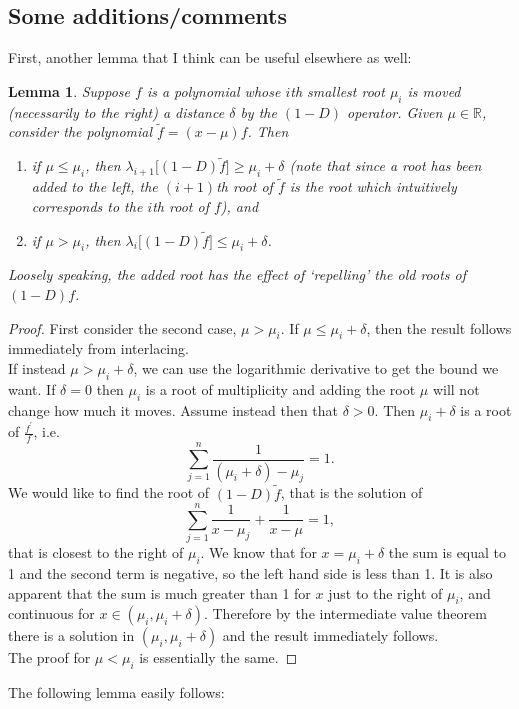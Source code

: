 \documentclass[11pt]{article}
\newtheorem{lemma}[theorem]{Lemma}
\newcommand{\R}{\mathbb{R}}
\begin{document}
\subsection{Some additions/comments}
First, another lemma that I think can be useful elsewhere as well:
\begin{lemma}
	Suppose $f$ is a polynomial whose $i$th smallest root $\mu_i$ is moved (necessarily to the right) a distance $\delta$ by the $(1-D)$ operator. Given $\mu \in \R$, consider the polynomial $\tilde{f} = (x-\mu)f$. Then
	\begin{enumerate}
		\item if $\mu \leq \mu_i$, then $\lambda_{i+1}\big[(1-D)\tilde{f}\big] \geq \mu_i + \delta$ (note that since a root has been added to the left, the $(i+1)$th root of $\tilde{f}$ is the root which intuitively corresponds to the $i$th root of $f$), and
		\item if $\mu > \mu_i$, then $\lambda_{i}\big[(1-D)\tilde{f}\big] \leq \mu_i + \delta$.
	\end{enumerate}
	Loosely speaking, the added root has the effect of `repelling' the old roots of $(1-D)f$.
\end{lemma}
\begin{proof}
	First consider the second case, $\mu > \mu_i$. If $\mu \leq \mu_i + \delta$, then the result follows immediately from interlacing. \\
	If instead $\mu > \mu_i + \delta$, we can use the logarithmic derivative to get the bound we want. If $\delta=0$ then $\mu_i$ is a root of multiplicity and adding the root $\mu$ will not change how much it moves. Assume instead then that $\delta>0$. Then $\mu_i+\delta$ is a root of $\frac{f^\prime}{f}$, i.e.
		\[ \sum_{j=1}^n \frac{1}{(\mu_i+\delta)-\mu_j} = 1. \]
	We would like to find the root of $(1-D)\tilde{f}$, that is the solution of
		\[ \sum_{j=1}^n \frac{1}{x-\mu_j} + \frac{1}{x-\mu} = 1, \]
	that is closest to the right of $\mu_i$. We know that for $x=\mu_i+\delta$ the sum is equal to 1 and the second term is negative, so the left hand side is less than 1. It is also apparent that the sum is much greater than 1 for $x$ just to the right of $\mu_i$, and continuous for $x \in (\mu_i, \mu_i+\delta)$. Therefore by the intermediate value theorem there is a solution in $(\mu_i, \mu_i+\delta)$ and the result immediately follows. \\
	The proof for $\mu<\mu_i$ is essentially the same.
\end{proof}

The following lemma easily follows:
\end{document}

